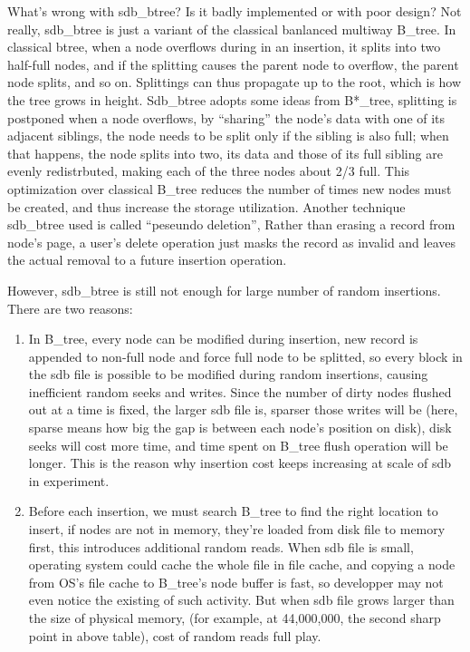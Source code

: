 \documentclass[a4paper,10pt]{article}
\begin{document}
What's wrong with sdb\_btree? Is it badly implemented or with poor design? Not really, sdb\_btree is just a variant of the classical banlanced multiway B\_tree. 
In classical btree, when a node overflows during in an insertion, it splits into two half-full nodes, and if the splitting causes the parent node to overflow, the parent node splits, and so on.
Splittings can thus propagate up to the root, which is how the tree grows in height. Sdb\_btree adopts some ideas from B*\_tree, splitting is postponed when a node overflows,
by ``sharing'' the node's data with one of its adjacent siblings, the node needs to be split only if the sibling is also full;
when that happens, the node splits into two, its data and those of its full sibling are evenly redistrbuted, making each of the three nodes about 2/3 full.
This optimization over classical B\_tree reduces the number of times new nodes must be created, and thus increase the storage utilization.
Another technique sdb\_btree used is called ``peseundo deletion'', Rather than erasing a record from node's page, 
a user's delete operation just masks the record as invalid and leaves the actual removal to a future insertion operation.

However, sdb\_btree is still not enough for large number of random insertions. There are two reasons:
\begin{enumerate}
\item In B\_tree, every node can be modified during insertion, new record is appended to non-full node and force full node to be splitted,
so every block in the sdb file is possible to be modified during random insertions, causing inefficient random seeks and writes.
Since the number of dirty nodes flushed out at a time is fixed, the larger sdb file is, sparser those writes will be (here, sparse means how big the gap is between each node's position on disk),
disk seeks will cost more time, and time spent on B\_tree flush operation will be longer. This is the reason why insertion cost keeps increasing at scale of sdb in experiment.
\item Before each insertion, we must search B\_tree to find the right location to insert, if nodes are not in memory, they're loaded from disk file to memory first, this introduces additional random reads.
When sdb file is small, operating system could cache the whole file in file cache, and copying a node from OS's file cache to B\_tree's node buffer is fast, so developper may not even notice the existing of such activity.
But when sdb file grows larger than the size of physical memory, (for example, at 44,000,000, the second sharp point in above table), cost of random reads full play.
\end{enumerate}
\end{document}
